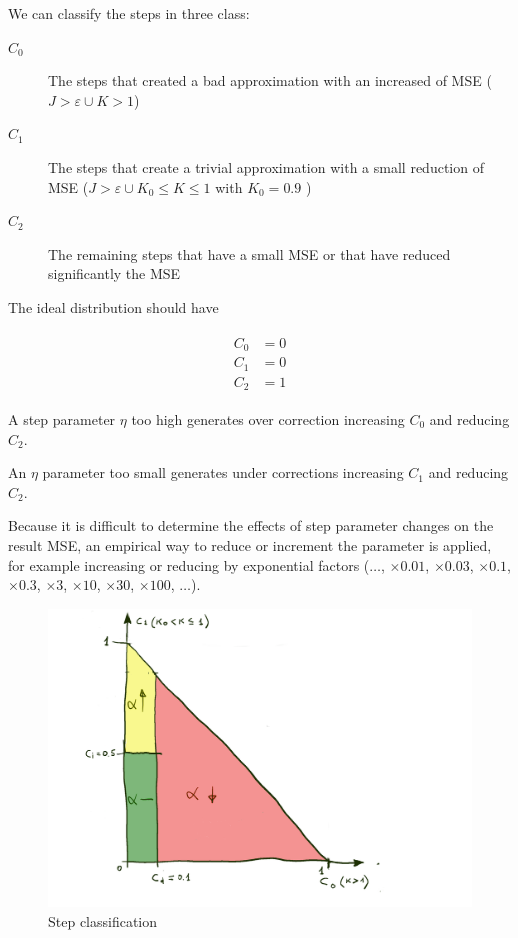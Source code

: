 \documentclass[]{article}
\begin{document}
We can classify the steps in three class:
\begin{description}

	\item[$ C_0 $]
	The steps that created a bad approximation with an increased of MSE ($ J > \varepsilon \cup K > 1$)

	\item[$ C_1 $]
	The steps that create a trivial approximation with a small reduction of MSE ($ J > \varepsilon \cup K_0 \le K \le 1 $ with $ K_0 = 0.9$ )

	\item[$ C_2 $]
	The remaining steps that have a small MSE or that have reduced significantly the MSE
\end{description}

The ideal distribution should have 

\begin{align}
\begin{split}
	C_0 & = 0
	\\
	C_1 & = 0
	\\
	C_2 & = 1
\end{split}
\end{align}

A step parameter $ \eta $ too high generates over correction increasing $ C_0 $ and reducing $ C_2 $.

An $ \eta $ parameter too small generates under corrections increasing $ C_1 $ and reducing $ C_2 $.

Because it is difficult to determine the effects of step parameter changes on the result MSE, an empirical way to reduce or increment the parameter is applied, for example increasing or reducing by exponential factors ($ \dots $, $ \times 0.01 $, $ \times 0.03 $, $ \times 0.1$, $\times 0.3 $, $ \times 3 $, $ \times 10 $, $ \times 30$, $\times 100 $, $ \dots $).

\begin{figure}[ht]
	\centering
	\includegraphics[width=\linewidth]{ann.png}
	\caption{Step classification}
	\label{fig:steps}
\end{figure}
\end{document}
